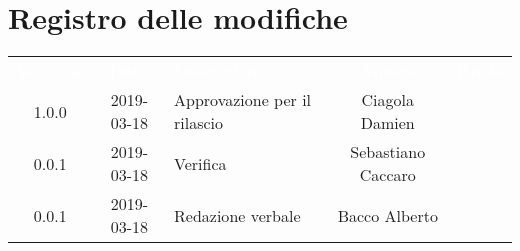 \section*{Registro delle modifiche}
{
	\renewcommand{\arraystretch}{1.5}
	\centering
	\begin{longtable}{ c c  C{4cm}  c  c }
		
		\textcolor{white}{\textbf{Versione}} & \textcolor{white}{\textbf{Data}} & \textcolor{white}{\textbf{Descrizione}} & \textcolor{white}{\textbf{Autore}} & \textcolor{white}{\textbf{Ruolo}}\\
		1.0.0 & 2019-03-18 & Approvazione per il rilascio & Ciagola Damien & \Res{}\\
		0.0.1 & 2019-03-18 & Verifica & Sebastiano Caccaro & \ver{}\\
		0.0.1 & 2019-03-18 & Redazione verbale & Bacco Alberto & \reda{}\\
		
		
	\end{longtable}
	
}